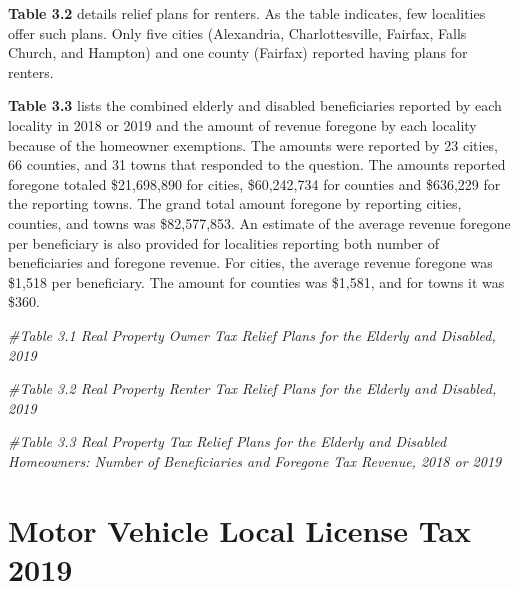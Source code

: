 \documentclass[
]{book}
\newenvironment{Shaded}{\begin{snugshade}}{\end{snugshade}}
\newcommand{\CommentTok}[1]{\textcolor[rgb]{0.56,0.35,0.01}{\textit{#1}}}
\begin{document}
\textbf{Table 3.2} details relief plans for renters. As the table indicates, few localities offer such plans. Only five cities
(Alexandria, Charlottesville, Fairfax, Falls Church, and Hampton) and one county (Fairfax) reported having plans
for renters.

\textbf{Table 3.3} lists the combined elderly and disabled beneficiaries reported by each locality in 2018 or 2019 and
the amount of revenue foregone by each locality because of the homeowner exemptions. The amounts were reported
by 23 cities, 66 counties, and 31 towns that responded to the question. The amounts reported foregone totaled \$21,698,890
for cities, \$60,242,734 for counties and \$636,229 for the reporting towns. The grand total amount foregone by
reporting cities, counties, and towns was \$82,577,853. An estimate of the average revenue foregone per beneficiary
is also provided for localities reporting both number of beneficiaries and foregone revenue. For cities, the average
revenue foregone was \$1,518 per beneficiary. The amount for counties was \$1,581, and for towns it was \$360.

\begin{Shaded}
\begin{Highlighting}[]
\CommentTok{\#Table 3.1 Real Property Owner Tax Relief Plans for the Elderly and Disabled, 2019}

\CommentTok{\#Table 3.2 Real Property Renter Tax Relief Plans for the Elderly and Disabled, 2019}

\CommentTok{\#Table 3.3 Real Property Tax Relief Plans for the Elderly and Disabled Homeowners: Number of Beneficiaries and Foregone Tax Revenue, 2018 or 2019}
\end{Highlighting}
\end{Shaded}

\hypertarget{motor-vehicle-local-license-tax-2019}{%
\chapter{Motor Vehicle Local License Tax 2019}\label{motor-vehicle-local-license-tax-2019}}
\end{document}
